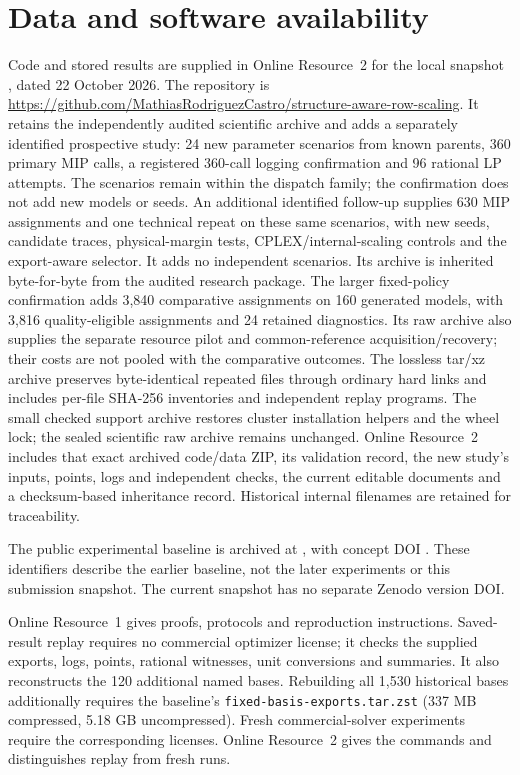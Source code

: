 \section*{Data and software availability}
Code and stored results are supplied in Online Resource~2 for the local snapshot
, dated 22 October 2026. The repository is
\url{https://github.com/MathiasRodriguezCastro/structure-aware-row-scaling}.
It retains the independently audited scientific archive
 and adds a separately identified prospective study:
24 new parameter scenarios from known parents, 360 primary MIP calls, a registered
360-call logging confirmation and 96 rational LP attempts. The scenarios remain
within the dispatch family; the confirmation does not add new models or seeds.
An additional identified follow-up supplies 630 MIP assignments and one technical
repeat on these same scenarios, with new seeds, candidate traces, physical-margin
tests, CPLEX/internal-scaling controls and the export-aware selector. It adds no
independent scenarios. Its archive is inherited byte-for-byte from the audited
research package.
The larger fixed-policy confirmation adds 3,840 comparative assignments on
160 generated models, with 3,816 quality-eligible assignments and 24 retained
diagnostics. Its raw archive also supplies the separate resource pilot and
common-reference acquisition/recovery; their costs are not pooled with the
comparative outcomes. The lossless tar/xz archive preserves byte-identical
repeated files through ordinary hard links and includes per-file SHA-256
inventories and independent replay programs.
The small checked support archive restores cluster installation helpers and
the wheel lock; the sealed scientific raw archive remains unchanged.
Online Resource~2 includes that exact archived code/data ZIP, its validation record,
the new study's inputs, points, logs and independent checks, the current editable
documents and a checksum-based inheritance record. Historical internal filenames
are retained for traceability.

The public experimental baseline  is archived at
, with concept DOI
. These identifiers describe the earlier baseline,
not the later experiments or this submission snapshot. The current snapshot has
no separate Zenodo version DOI.

Online Resource~1 gives proofs, protocols and reproduction instructions. Saved-result
replay requires no commercial optimizer license; it checks the supplied exports,
logs, points, rational witnesses, unit conversions and summaries. It also reconstructs
the 120 additional named bases. Rebuilding all 1,530 historical bases additionally
requires the baseline's \texttt{fixed-basis-exports.tar.zst} (337 MB compressed,
5.18 GB uncompressed). Fresh commercial-solver experiments require the corresponding
licenses. Online Resource~2 gives the commands and distinguishes replay from fresh runs.
